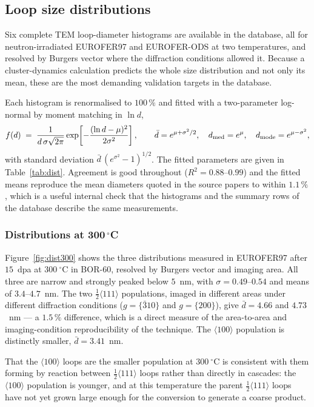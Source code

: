 \subsection{Loop size distributions}
\label{sec:expdb:distributions}

Six complete TEM loop-diameter histograms are available in the database, all for
neutron-irradiated EUROFER97 and EUROFER-ODS at two temperatures, and resolved by
Burgers vector where the diffraction conditions allowed it. Because a
cluster-dynamics calculation predicts the whole size distribution and not only
its mean, these are the most demanding validation targets in the database.

Each histogram is renormalised to $100\,\%$ and fitted with a two-parameter
log-normal by moment matching in $\ln d$,
\begin{equation}
  f(d) \;=\; \frac{1}{d\,\sigma\sqrt{2\pi}}
             \exp\!\left[-\frac{(\ln d - \mu)^{2}}{2\sigma^{2}}\right],
  \qquad
  \bar d = e^{\mu + \sigma^{2}/2}, \quad
  d_{\rm med} = e^{\mu}, \quad
  d_{\rm mode} = e^{\mu - \sigma^{2}},
  \label{eq:lognorm}
\end{equation}
with standard deviation $\bar d\,(e^{\sigma^{2}}-1)^{1/2}$. The fitted parameters
are given in Table~\ref{tab:dist}. Agreement is good throughout
($R^{2} = 0.88$--$0.99$) and the fitted means reproduce the mean diameters quoted
in the source papers to within $1.1\,\%$, which is a useful internal check
that the histograms and the summary rows of the database describe the same
measurements.

\subsubsection{Distributions at 300\,$^{\circ}$C}

Figure~\ref{fig:dist300} shows the three distributions measured in EUROFER97
after $15$~dpa at $300~^{\circ}$C in BOR-60, resolved by Burgers vector and
imaging area. All three are narrow and strongly peaked below $5$~nm, with
$\sigma = 0.49$--$0.54$ and means of $3.4$--$4.7$~nm. The two $\frac{1}{2}\langle
111\rangle$ populations, imaged in different areas under different diffraction
conditions ($g = \{\bar{3}10\}$ and $g = \{200\}$), give $\bar d = 4.66$ and
$4.73$~nm --- a $1.5\,\%$ difference, which is a direct measure of the
area-to-area and imaging-condition reproducibility of the technique. The
$\langle 100\rangle$ population is distinctly smaller, $\bar d = 3.41$~nm.

That the $\langle 100\rangle$ loops are the smaller population at $300~^{\circ}$C
is consistent with them forming by reaction between $\frac{1}{2}\langle
111\rangle$ loops rather than directly in cascades: the $\langle 100\rangle$
population is younger, and at this temperature the parent $\frac{1}{2}\langle
111\rangle$ loops have not yet grown large enough for the conversion to
generate a coarse product.

